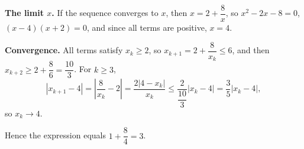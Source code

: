 \textbf{The limit $x$.} If the sequence converges to $x$, then $x=2+\dfrac{8}{x}$, so $x^2-2x-8=0$, $(x-4)(x+2)=0$, and since all terms are positive, $x=4$.

\textbf{Convergence.} All terms satisfy $x_k\ge2$, so $x_{k+1}=2+\dfrac{8}{x_k}\le6$, and then $x_{k+2}\ge2+\dfrac{8}{6}=\dfrac{10}{3}$. For $k\ge3$,
\[
|x_{k+1}-4|=\left|\dfrac{8}{x_k}-2\right|=\dfrac{2|4-x_k|}{x_k}\le\dfrac{2}{\dfrac{10}{3}}|x_k-4|=\dfrac{3}{5}|x_k-4| ,
\]
so $x_k\to4$.

Hence the expression equals $1+\dfrac{8}{4}=\boxed{3}$.
